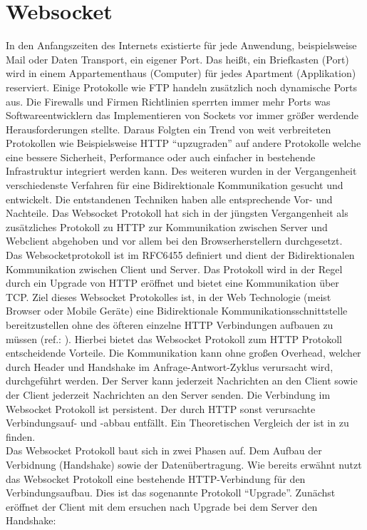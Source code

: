 \chapter{Websocket}
\label{cha:Websocket}
In den Anfangszeiten des Internets existierte für jede Anwendung, beispielsweise Mail oder Daten Transport, ein eigener Port. Das heißt, ein Briefkasten (Port) wird in einem Appartementhaus (Computer) für jedes Apartment (Applikation) reserviert. Einige Protokolle wie \zB FTP handeln zusätzlich noch dynamische Ports aus. Die Firewalls und Firmen Richtlinien sperrten immer mehr Ports was Softwareentwicklern das Implementieren von Sockets vor immer größer werdende Herausforderungen stellte. Daraus Folgten ein Trend von weit verbreiteten Protokollen wie Beispielsweise HTTP "`upzugraden"' auf andere Protokolle welche eine bessere Sicherheit, Performance oder auch einfacher in bestehende Infrastruktur integriert werden kann. Des weiteren wurden in der Vergangenheit verschiedenste Verfahren für eine Bidirektionale Kommunikation gesucht und entwickelt. Die entstandenen Techniken haben alle entsprechende Vor- und Nachteile. Das Websocket Protokoll hat sich in der jüngsten Vergangenheit als zusätzliches Protokoll zu HTTP zur Kommunikation zwischen Server und Webclient abgehoben und vor allem bei den Browserherstellern durchgesetzt.
\\Das Websocketprotokoll ist im RFC6455 definiert und dient der Bidirektionalen Kommunikation zwischen Client und Server. Das Protokoll wird in der Regel durch ein Upgrade von HTTP eröffnet und bietet eine Kommunikation über TCP. Ziel dieses Websocket Protokolles ist, in der Web Technologie (meist Browser oder Mobile Geräte) eine Bidirektionale Kommunikationsschnittstelle bereitzustellen ohne des öfteren einzelne HTTP Verbindungen aufbauen zu müssen (ref.: \cite{The WebSocket Protocol}).
Hierbei bietet das Websocket Protokoll zum HTTP Protokoll entscheidende Vorteile. Die Kommunikation kann ohne großen Overhead, welcher durch Header und Handshake im Anfrage-Antwort-Zyklus verursacht wird, durchgeführt werden. Der Server kann jederzeit Nachrichten an den Client sowie der Client jederzeit Nachrichten an den Server senden. Die Verbindung im Websocket Protokoll ist persistent. Der durch HTTP sonst verursachte Verbindungsauf- und -abbau entfällt. Ein Theoretischen Vergleich der ist in \cite{Interaktives Monitorsystem zur besonderen medialen Darstellung von Produkten am Point of Sale} zu finden.
\\ \newline
Das Websocket Protokoll baut sich in zwei Phasen auf. Dem Aufbau der Verbidnung (Handshake) sowie der Datenübertragung. Wie bereits erwähnt nutzt das Websocket Protokoll eine bestehende HTTP-Verbindung für den Verbindungsaufbau. Dies ist das sogenannte Protokoll "`Upgrade"'. Zunächst eröffnet der Client mit dem ersuchen nach Upgrade bei dem Server den Handshake:

